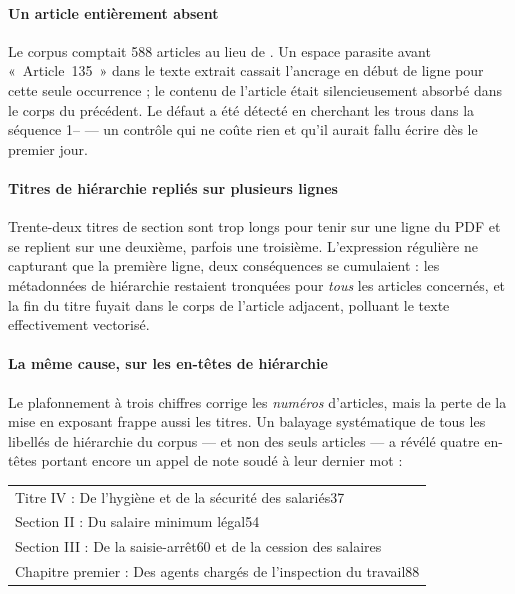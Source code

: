 \paragraph{Un article entièrement absent}
Le corpus comptait 588 articles au lieu de \NbArticles{}. Un espace parasite avant «~Article~135~»
dans le texte extrait cassait l'ancrage en début de ligne pour cette seule occurrence ; le contenu
de l'article était silencieusement absorbé dans le corps du précédent. Le défaut a été détecté en
cherchant les trous dans la séquence 1--\NbArticles{} --- un contrôle qui ne coûte rien et qu'il
aurait fallu écrire dès le premier jour.

\paragraph{Titres de hiérarchie repliés sur plusieurs lignes}
Trente-deux titres de section sont trop longs pour tenir sur une ligne du PDF et se replient sur
une deuxième, parfois une troisième. L'expression régulière ne capturant que la première ligne,
deux conséquences se cumulaient : les métadonnées de hiérarchie restaient tronquées pour
\emph{tous} les articles concernés, et la fin du titre fuyait dans le corps de l'article adjacent,
polluant le texte effectivement vectorisé.

\paragraph{La même cause, sur les en-têtes de hiérarchie}
Le plafonnement à trois chiffres corrige les \emph{numéros} d'articles, mais la perte de la mise
en exposant frappe aussi les titres. Un balayage systématique de tous les libellés de hiérarchie
du corpus --- et non des seuls articles --- a révélé quatre en-têtes portant encore un appel de
note soudé à leur dernier mot :

\begin{center}\small\ttfamily
\begin{tabular}{@{}l@{}}
Titre IV : De l'hygiène et de la sécurité des salariés\textcolor{anrtred}{37}\\
Section II : Du salaire minimum légal\textcolor{anrtred}{54}\\
Section III : De la saisie-arrêt\textcolor{anrtred}{60} et de la cession des salaires\\
Chapitre premier : Des agents chargés de l'inspection du travail\textcolor{anrtred}{88}\\
\end{tabular}
\end{center}

